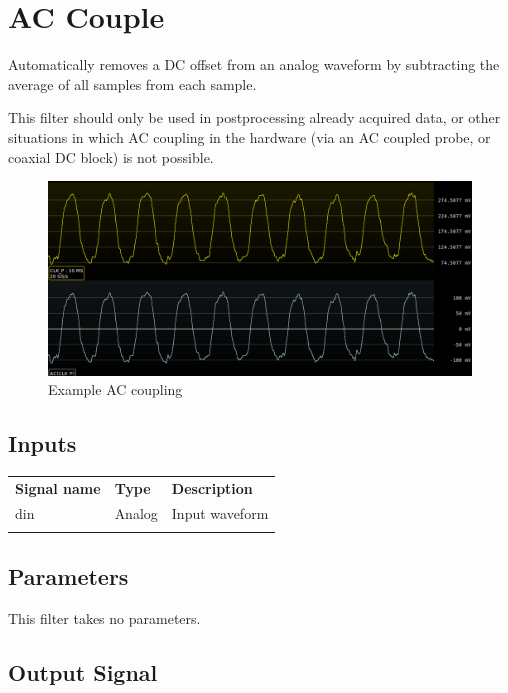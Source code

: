 \pagebreak
\section{AC Couple}
\label{filter:accouple}

Automatically removes a DC offset from an analog waveform by subtracting the average of all samples from each sample.

This filter should only be used in postprocessing already acquired data, or other situations in which AC coupling in
the hardware (via an AC coupled probe, or coaxial DC block) is not possible.

\begin{figure}[h]
\centering
\includegraphics[width=16cm]{images/filters/ac-couple.png}
\caption{Example AC coupling}
\end{figure}

\subsection{Inputs}

\begin{tabularx}{16cm}{llX}
\thickhline
\textbf{Signal name} & \textbf{Type} & \textbf{Description} \\
\thickhline
din & Analog & Input waveform \\
\thickhline
\end{tabularx}

\subsection{Parameters}

This filter takes no parameters.

\subsection{Output Signal}

